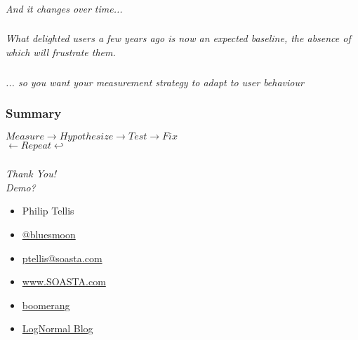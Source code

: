 \documentclass{beamer}
\newcommand{\innersplash}[1]{
  \begin{center}
    \Large \textrm{\textit{ #1 } }
  \end{center}
}
\newcommand{\splashslide}[2][{}]{
  \begin{frame}
  \frametitle{#1}
  \innersplash{#2}
  \end{frame}
}
\begin{document}
\splashslide{And it changes over time...}

\splashslide{What delighted users a few years ago is now an expected baseline, the absence of which will frustrate them.}

\splashslide{... so you want your measurement strategy to adapt to user behaviour}

\splashslide[Summary]{$ Measure \rightarrow Hypothesize \rightarrow Test \rightarrow Fix $ \\ $ \leftarrow Repeat \hookleftarrow $}

\splashslide{Thank You! \\ Demo?}

\begin{frame}
  \begin{itemize}
  \item Philip Tellis
  \item \href{http://twitter.com/bluesmoon}{@bluesmoon}
  \item \href{http://bluesmoon.info/}{ptellis@soasta.com}
  \item \href{http://www.soasta.com/}{www.SOASTA.com}
  \item \href{http://lognormal.github.com/boomerang/doc/}{boomerang}
  \item \href{http://www.lognormal.com/blog/}{LogNormal Blog}
  \end{itemize}
\end{frame}
\end{document}
